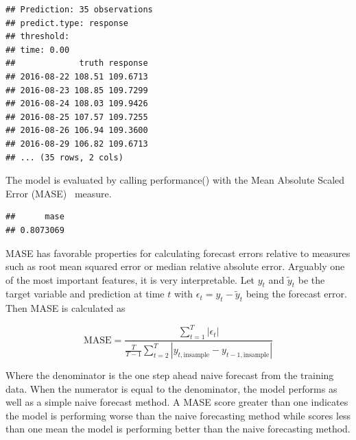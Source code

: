 \documentclass[12pt]{article}%
\makeatletter
\theoremstyle{definition}
\newcommand\code{\@codex}
\def\@codex#1{{\normalfont\ttfamily\hyphenchar\font=-1 #1}}
\makeatother
\begin{document}
\singlespacing
\begin{knitrout}
\color{fgcolor}\begin{kframe}
\begin{alltt}
 \hlkwb{=}   
\end{alltt}
\begin{verbatim}
## Prediction: 35 observations
## predict.type: response
## threshold: 
## time: 0.00
##             truth response
## 2016-08-22 108.51 109.6713
## 2016-08-23 108.85 109.7299
## 2016-08-24 108.03 109.9426
## 2016-08-25 107.57 109.7255
## 2016-08-26 106.94 109.3600
## 2016-08-29 106.82 109.6713
## ... (35 rows, 2 cols)
\end{verbatim}
\end{kframe}
\end{knitrout}
\doublespacing

The model is evaluated by calling \code{performance()} with the Mean Absolute Scaled Error (MASE)~\cite{Hyndman2006} measure.

\singlespacing
\begin{knitrout}
\color{fgcolor}\begin{kframe}
\begin{alltt}
  
             
\end{alltt}
\begin{verbatim}
##      mase 
## 0.8073069
\end{verbatim}
\end{kframe}
\end{knitrout}
\doublespacing
MASE has favorable properties for calculating forecast errors relative to measures such as root mean squared error or median relative absolute error. Arguably one of the most important features, it is very interpretable. Let $y_t$ and $\tilde{y}_t$ be the target variable and prediction at time $t$ with $\epsilon_t = y_t - \tilde{y}_t$ being the forecast error. Then MASE is calculated as

\begin{equation}
\text{MASE} = \frac{\sum_{t=1}^T |\epsilon_t|}{\frac{T}{T-1} \sum_{t=2}^T |y_{t, \text{insample}} - y_{t-1, \text{insample}}|}
\end{equation}

Where the denominator is the one step ahead naive forecast from the training data. When the numerator is equal to the denominator, the model performs as well as a simple naive forecast method. A MASE score greater than one indicates the model is performing worse than the naive forecasting method while scores less than one mean the model is performing better than the naive forecasting method.
\end{document}
